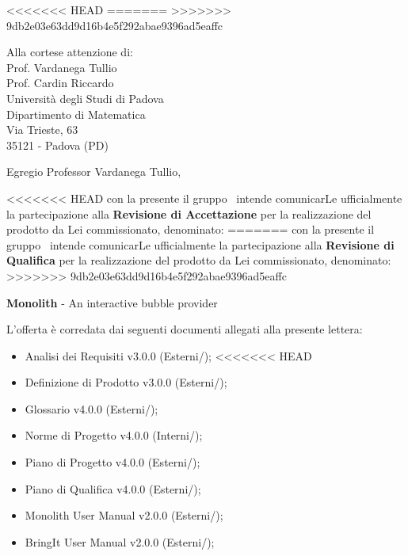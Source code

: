 

\newcommand{\logo}{../../Template/Logo/Logo.png}
\newcommand{\data}{\today}
<<<<<<< HEAD
\newcommand{\oggetto}{Partecipazione alla Revisione di Accettazione.}
\newcommand{\mittente}{Manuel Turetta \\ Responsabile NPE Developers}
\newcommand{\firma}{../../Template/Firme/MT.png}
=======
\newcommand{\oggetto}{Partecipazione alla Revisione di Qualifica.}
\newcommand{\mittente}{Francesco Bazzerla \\ Responsabile NPE Developers}
\newcommand{\firma}{../../Template/Firme/FB.png}
>>>>>>> 9db2e03e63dd9d16b4e5f292abae9396ad5eaffc





\begin{letter}{Alla cortese attenzione di:  \\
 Prof. Vardanega Tullio \\
 Prof. Cardin Riccardo \\
 Università degli Studi di Padova \\
 Dipartimento di Matematica \\
 Via Trieste, 63 \\
 35121 - Padova (PD)}

\opening{Egregio Professor Vardanega Tullio,} 

<<<<<<< HEAD
con la presente il gruppo \gruppo\ intende comunicarLe ufficialmente la partecipazione alla \textbf{Revisione di Accettazione} per la realizzazione del prodotto da Lei commissionato, denominato:
=======
con la presente il gruppo \gruppo\ intende comunicarLe ufficialmente la partecipazione alla \textbf{Revisione di Qualifica} per la realizzazione del prodotto da Lei commissionato, denominato:
>>>>>>> 9db2e03e63dd9d16b4e5f292abae9396ad5eaffc
\begin{center}
\textbf{Monolith} - An interactive bubble provider
\end{center}
L'offerta è corredata dai seguenti documenti allegati alla presente lettera:
\begin{itemize}
	\item Analisi dei Requisiti v3.0.0 (Esterni/\analisiDeiRequisiti);
<<<<<<< HEAD
	\item Definizione di Prodotto v3.0.0 (Esterni/);
	\item Glossario v4.0.0 (Esterni/\glossario);
	\item Norme di Progetto v4.0.0 (Interni/\normeDiProgetto);
	\item Piano di Progetto v4.0.0 (Esterni/\pianoDiProgetto);
	\item Piano di Qualifica v4.0.0 (Esterni/\pianoDiQualifica);
	\item Monolith User Manual v2.0.0 (Esterni/\manualeUtente);
	\item BringIt User Manual v2.0.0 (Esterni/\manualeUtenteApp);
\end{itemize}


\end{letter}
